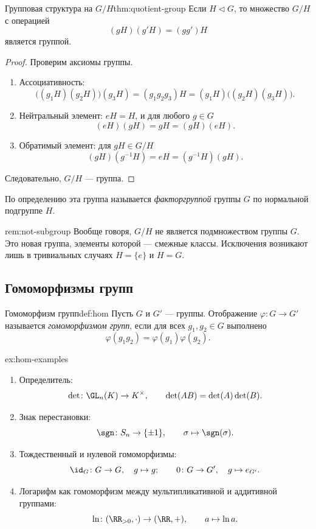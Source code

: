 \begin{Theorem}{Групповая структура на $G/H$}{thm:quotient-group}
	Если $H \triangleleft G$, то множество $G/H$ с операцией
	\[
	(gH)(g'H)=(gg')H
	\]
	является группой.
\end{Theorem}

\begin{proof}
	Проверим аксиомы группы.
	\begin{enumerate}
		\item Ассоциативность:
		\[
		\bigl((g_1H)(g_2H)\bigr)(g_3H) = (g_1g_2g_3)H = (g_1H)\bigl((g_2H)(g_3H)\bigr).
		\]
		\item Нейтральный элемент: $eH=H$, и для любого $g\in G$
		\[
		(eH)(gH)=gH=(gH)(eH).
		\]
		\item Обратимый элемент: для $gH\in G/H$
		\[
		(gH)(g^{-1}H)=eH=(g^{-1}H)(gH).
		\]
	\end{enumerate}
	Следовательно, $G/H$ --- группа.
\end{proof}

По определению эта группа называется \emph{факторгруппой} группы $G$ по нормальной подгруппе $H$.

\begin{Remark}{}{rem:not-subgroup}
	Вообще говоря, $G/H$ не является подмножеством группы $G$. Это новая группа, элементы которой --- смежные классы. Исключения возникают лишь в тривиальных случаях $H=\{e\}$ и $H=G$.
\end{Remark}

\subsection{Гомоморфизмы групп}

\begin{Definition}{Гомоморфизм групп}{def:hom}
	Пусть $G$ и $G'$ --- группы. Отображение $\varphi\colon G \to G'$
	называется \emph{гомоморфизмом групп}, если для всех $g_1,g_2\in G$ выполнено
	\[
	\varphi(g_1g_2)=\varphi(g_1)\varphi(g_2).
	\]
\end{Definition}

\begin{Example}{}{ex:hom-examples}
	\begin{enumerate}
		\item Определитель:
		\[
		\det\colon \GL_n(K) \to K^{\times}, \qquad \det(AB)=\det(A)\det(B).
		\]
		\item Знак перестановки:
		\[
		\sgn\colon S_n \to \{\pm 1\}, \qquad \sigma \mapsto \sgn(\sigma).
		\]
		\item Тождественный и нулевой гомоморфизмы:
		\[
		\id_G\colon G\to G, \quad g\mapsto g;
		\qquad
		0\colon G\to G', \quad g\mapsto e_{G'}.
		\]
		\item Логарифм как гомоморфизм между мультипликативной и аддитивной группами:
		\[
		\ln\colon (\RR_{>0},\cdot) \to (\RR,+), \qquad a\mapsto \ln a.
		\]
	\end{enumerate}
\end{Example}

